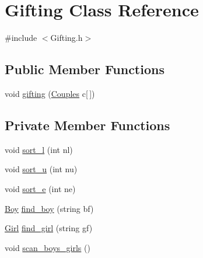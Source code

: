 \hypertarget{classGifting}{}\section{Gifting Class Reference}
\label{classGifting}


{\ttfamily \#include $<$Gifting.\+h$>$}

\subsection*{Public Member Functions}
\begin{DoxyCompactItemize}
\item 
void \hyperlink{classGifting_a1eb3c06f799c98f1d3fdfffb5bd69681}{gifting} (\hyperlink{classCouples}{Couples} c\mbox{[}$\,$\mbox{]})
\end{DoxyCompactItemize}
\subsection*{Private Member Functions}
\begin{DoxyCompactItemize}
\item 
void \hyperlink{classGifting_ae8dbde0276865ceac833249e53d5070d}{sort\+\_\+l} (int nl)
\item 
void \hyperlink{classGifting_a1ee5a3343e9424b7fdea860fe8329788}{sort\+\_\+u} (int nu)
\item 
void \hyperlink{classGifting_a3e6a338a3bc0e9f57e8bdba2f84e040b}{sort\+\_\+e} (int ne)
\item 
\hyperlink{classBoy}{Boy} \hyperlink{classGifting_aa3918dda151ab90e1508c0fd13798807}{find\+\_\+boy} (string bf)
\item 
\hyperlink{classGirl}{Girl} \hyperlink{classGifting_a0a8dade411e6c802b97797a92ef1302a}{find\+\_\+girl} (string gf)
\item 
void \hyperlink{classGifting_ae076b4496936b1f6d8564f32a3630ed3}{scan\+\_\+boys\+\_\+girls} ()
\end{DoxyCompactItemize}
